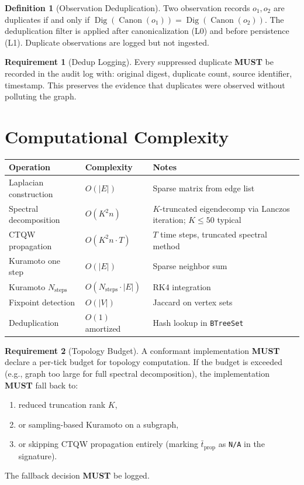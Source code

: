 \documentclass[11pt,a4paper,twoside]{article}
\theoremstyle{definition}
\newtheorem{definition}{Definition}[section]
\newtheorem{requirement}{Requirement}[section]
\theoremstyle{plain}
\theoremstyle{remark}
\DeclareMathOperator{\Dig}{Dig}
\DeclareMathOperator{\Canon}{Canon}
\begin{document}
\begin{definition}[Observation Deduplication]\label{def:dedup}
Two observation records $o_1, o_2$ are duplicates if and only if
$\Dig(\Canon(o_1)) = \Dig(\Canon(o_2))$. The deduplication filter
is applied after canonicalization (L0) and before persistence (L1).
Duplicate observations are logged but not ingested.
\end{definition}

\begin{requirement}[Dedup Logging]\label{req:deduplog}
Every suppressed duplicate \textbf{MUST} be recorded in the audit log
with: original digest, duplicate count, source identifier, timestamp.
This preserves the evidence that duplicates were observed without
polluting the graph.
\end{requirement}


\section{Computational Complexity}\label{sec:topo:complexity}

\begin{tabularx}{\textwidth}{l l X}
\toprule
\textbf{Operation} & \textbf{Complexity} & \textbf{Notes} \\
\midrule
Laplacian construction & $O(|E|)$ & Sparse matrix from edge list \\
Spectral decomposition & $O(K^2 n)$ & $K$-truncated eigendecomp via
  Lanczos iteration; $K \le 50$ typical \\
CTQW propagation & $O(K^2 n \cdot T)$ & $T$ time steps, truncated
  spectral method \\
Kuramoto one step & $O(|E|)$ & Sparse neighbor sum \\
Kuramoto $N_{\mathrm{steps}}$ & $O(N_{\mathrm{steps}} \cdot |E|)$ &
  RK4 integration \\
Fixpoint detection & $O(|V|)$ & Jaccard on vertex sets \\
Deduplication & $O(1)$ amortized & Hash lookup in \texttt{BTreeSet} \\
\bottomrule
\end{tabularx}

\begin{requirement}[Topology Budget]\label{req:topobudget}
A conformant implementation \textbf{MUST} declare a per-tick budget
for topology computation. If the budget is exceeded (e.g., graph too
large for full spectral decomposition), the implementation \textbf{MUST}
fall back to:
\begin{enumerate}[nosep,label=(\alph*)]
  \item reduced truncation rank $K$,
  \item or sampling-based Kuramoto on a subgraph,
  \item or skipping CTQW propagation entirely (marking
        $\bar{t}_{\mathrm{prop}}$ as \texttt{N/A} in the signature).
\end{enumerate}
The fallback decision \textbf{MUST} be logged.
\end{requirement}
\end{document}
